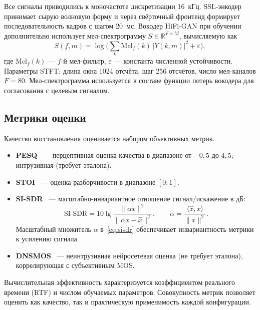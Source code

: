 Все сигналы приводились к моночастоте дискретизации 16~кГц. SSL-энкодер
принимает сырую волновую форму и через свёрточный фронтенд формирует
последовательность кадров с шагом 20~мс. Вокодер HiFi-GAN при обучении
дополнительно использует мел-спектрограмму $S\in\mathbb{R}^{F\times M}$,
вычисляемую как
\begin{equation}
    S(f,m) = \log\!\Big(\textstyle\sum_{k} \mathrm{Mel}_f(k)\,|Y(k,m)|^2 +
    \varepsilon\Big),
    \label{eq:mel}
\end{equation}
где $\mathrm{Mel}_f(k)$ --- $f$-й мел-фильтр, $\varepsilon$ --- константа
численной устойчивости. Параметры STFT: длина окна 1024 отсчёта, шаг 256
отсчётов, число мел-каналов $F=80$. Мел-спектрограмма используется в составе
функции потерь вокодера для согласования с целевым сигналом.

\subsection{Метрики оценки}
\label{ssec:metrics}

Качество восстановления оценивается набором объективных метрик.
\begin{itemize}
    \item \textbf{PESQ}~\cite{pesq} --- перцептивная оценка качества в диапазоне
        от $-0{,}5$ до $4{,}5$; интрузивная (требует эталона).
    \item \textbf{STOI}~\cite{stoi} --- оценка разборчивости в диапазоне
        $[0;1]$.
    \item \textbf{SI-SDR}~\cite{sisdr} --- масштабно-инвариантное отношение
        сигнал/искажение в дБ:
        \begin{equation}
            \mathrm{SI\text{-}SDR} = 10\lg
            \frac{\|\alpha x\|^2}{\|\alpha x - \hat{x}\|^2},
            \qquad
            \alpha = \frac{\langle \hat{x}, x\rangle}{\|x\|^2}.
            \label{eq:sisdr}
        \end{equation}
        Масштабный множитель $\alpha$ в~\eqref{eq:sisdr} обеспечивает
        инвариантность метрики к усилению сигнала.
    \item \textbf{DNSMOS}~\cite{dnsmos} --- неинтрузивная нейросетевая оценка
        (не требует эталона), коррелирующая с субъективным MOS.
\end{itemize}
Вычислительная эффективность характеризуется коэффициентом реального времени
(RTF) и числом обучаемых параметров. Совокупность метрик позволяет оценить как
качество, так и практическую применимость каждой конфигурации.
